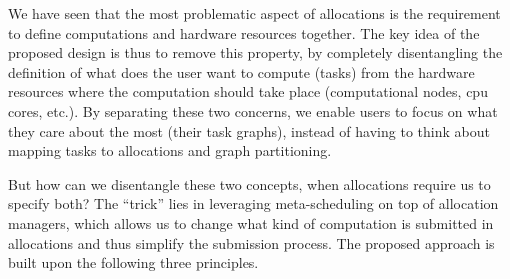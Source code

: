 We have seen that the most problematic aspect of allocations is the requirement to define
computations and hardware resources together. The key idea of the proposed design is thus to remove
this property, by completely disentangling the definition of what does the user want to compute
(tasks) from the hardware resources where the computation should take place (computational nodes,
\gls{cpu} cores, etc.). By separating these two concerns, we enable users to focus on
what they care about the most (their task graphs), instead of having to think about mapping tasks
to allocations and graph partitioning.

But how can we disentangle these two concepts, when allocations require us to specify both? The
``trick'' lies in leveraging meta-scheduling on top of allocation managers, which allows us to
change what kind of computation is submitted in allocations and thus simplify the submission
process. The proposed approach is built upon the following three principles.

